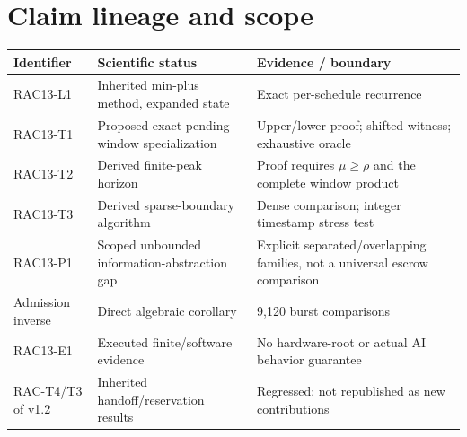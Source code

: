 \documentclass[11pt,a4paper]{article}
\theoremstyle{definition}\newtheorem{definition}{Definition}
\begin{document}
\section{Claim lineage and scope}
\begin{table}[H]
\centering\small
\begin{tabularx}{\linewidth}{@{}lXX@{}}\toprule
Identifier & Scientific status & Evidence / boundary\\\midrule
RAC13-L1 & Inherited min-plus method, expanded state & Exact per-schedule recurrence\\
RAC13-T1 & Proposed exact pending-window specialization & Upper/lower proof; shifted witness; exhaustive oracle\\
RAC13-T2 & Derived finite-peak horizon & Proof requires $\mu\ge\rho$ and the complete window product\\
RAC13-T3 & Derived sparse-boundary algorithm & Dense comparison; integer timestamp stress test\\
RAC13-P1 & Scoped unbounded information-abstraction gap & Explicit separated/overlapping families, not a universal escrow comparison\\
Admission inverse & Direct algebraic corollary & 9,120 burst comparisons\\
RAC13-E1 & Executed finite/software evidence & No hardware-root or actual AI behavior guarantee\\
RAC-T4/T3 of v1.2 & Inherited handoff/reservation results & Regressed; not republished as new contributions\\\bottomrule
\end{tabularx}
\end{table}
\end{document}
